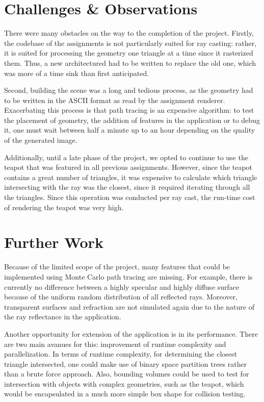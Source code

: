 \documentclass[journal]{IEEEtran}
\begin{document}
\section{Challenges \& Observations}
There were many obstacles on the way to the completion of the project. Firstly, the codebase of the assignments is not particularly suited for ray casting: rather, it is suited for processing the geometry one triangle at a time since it rasterized them. Thus, a new architectured had to be written to replace the old one, which was more of a time sink than first anticipated. 
\par
Second, building the scene was a long and tedious process, as the geometry had to be written in the ASCII format as read by the assignment renderer. Exacerbating this process is that path tracing is an expensive algorithm: to test the placement of geometry, the addition of features in the application or to debug it, one must wait between half a minute up to an hour depending on the quality of the generated image.
\par
Additionally, until a late phase of the project, we opted to continue to use the teapot that was featured in all previous assignments. However, since the teapot contains a great number of triangles, it was  expensive to calculate which triangle intersecting with the ray was the closest, since it required iterating through all the triangles. Since this operation was conducted per ray cast, the run-time cost of rendering the teapot was very high.

\section{Further Work}
Because of the limited scope of the project, many features that could be implemented using Monte Carlo path tracing are missing. For example, there is currently no difference between a highly specular and highly diffuse surface because of the uniform random distribution of all reflected rays. Moreover, transparent surfaces and refraction are not simulated again due to the nature of the ray reflectance in the application.

\par
Another opportunity for extension of the application is in its performance. There are two main avanues for this: improvement of runtime complexity and parallelization. In terms of runtime complexity, for determining the closest triangle intersected, one could make use of binary space partition trees rather than a brute force approach. Also, bounding volumes could be used to test for intersection with objects with complex geometries, such as the teapot, which would be encapsulated in a much more simple box shape for collision testing.
\end{document}
